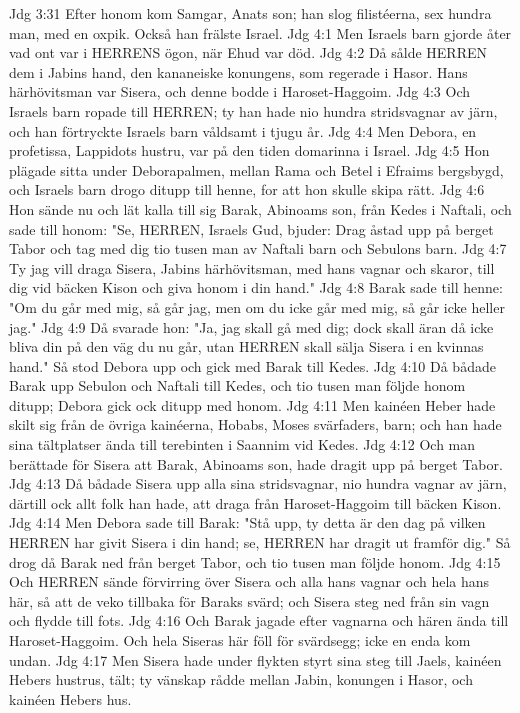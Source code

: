 Jdg 3:31  Efter honom kom Samgar, Anats son; han slog filistéerna, sex hundra man, med en oxpik. Också han frälste Israel.
Jdg 4:1  Men Israels barn gjorde åter vad ont var i HERRENS ögon, när Ehud var död.
Jdg 4:2  Då sålde HERREN dem i Jabins hand, den kananeiske konungens, som regerade i Hasor. Hans härhövitsman var Sisera, och denne bodde i Haroset-Haggoim.
Jdg 4:3  Och Israels barn ropade till HERREN; ty han hade nio hundra stridsvagnar av järn, och han förtryckte Israels barn våldsamt i tjugu år.
Jdg 4:4  Men Debora, en profetissa, Lappidots hustru, var på den tiden domarinna i Israel.
Jdg 4:5  Hon plägade sitta under Deborapalmen, mellan Rama och Betel i Efraims bergsbygd, och Israels barn drogo ditupp till henne, for att hon skulle skipa rätt.
Jdg 4:6  Hon sände nu och lät kalla till sig Barak, Abinoams son, från Kedes i Naftali, och sade till honom: "Se, HERREN, Israels Gud, bjuder: Drag åstad upp på berget Tabor och tag med dig tio tusen man av Naftali barn och Sebulons barn.
Jdg 4:7  Ty jag vill draga Sisera, Jabins härhövitsman, med hans vagnar och skaror, till dig vid bäcken Kison och giva honom i din hand."
Jdg 4:8  Barak sade till henne: "Om du går med mig, så går jag, men om du icke går med mig, så går icke heller jag."
Jdg 4:9  Då svarade hon: "Ja, jag skall gå med dig; dock skall äran då icke bliva din på den väg du nu går, utan HERREN skall sälja Sisera i en kvinnas hand." Så stod Debora upp och gick med Barak till Kedes.
Jdg 4:10  Då bådade Barak upp Sebulon och Naftali till Kedes, och tio tusen man följde honom ditupp; Debora gick ock ditupp med honom.
Jdg 4:11  Men kainéen Heber hade skilt sig från de övriga kainéerna, Hobabs, Moses svärfaders, barn; och han hade sina tältplatser ända till terebinten i Saannim vid Kedes.
Jdg 4:12  Och man berättade för Sisera att Barak, Abinoams son, hade dragit upp på berget Tabor.
Jdg 4:13  Då bådade Sisera upp alla sina stridsvagnar, nio hundra vagnar av järn, därtill ock allt folk han hade, att draga från Haroset-Haggoim till bäcken Kison.
Jdg 4:14  Men Debora sade till Barak: "Stå upp, ty detta är den dag på vilken HERREN har givit Sisera i din hand; se, HERREN har dragit ut framför dig." Så drog då Barak ned från berget Tabor, och tio tusen man följde honom.
Jdg 4:15  Och HERREN sände förvirring över Sisera och alla hans vagnar och hela hans här, så att de veko tillbaka för Baraks svärd; och Sisera steg ned från sin vagn och flydde till fots.
Jdg 4:16  Och Barak jagade efter vagnarna och hären ända till Haroset-Haggoim. Och hela Siseras här föll för svärdsegg; icke en enda kom undan.
Jdg 4:17  Men Sisera hade under flykten styrt sina steg till Jaels, kainéen Hebers hustrus, tält; ty vänskap rådde mellan Jabin, konungen i Hasor, och kainéen Hebers hus.
